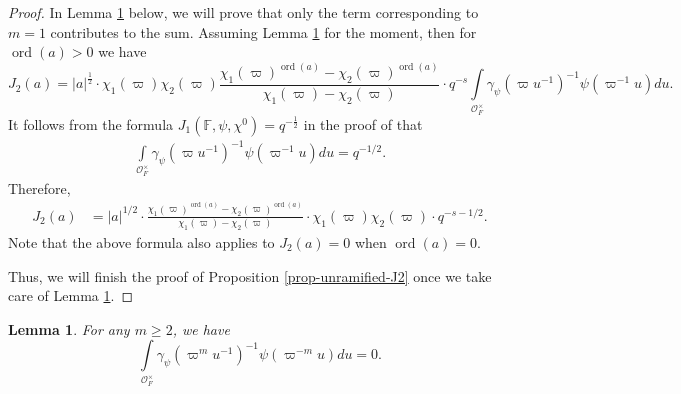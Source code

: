 \documentclass[11pt]{amsart}
\newtheorem{lemma}[theorem]{Lemma}
\theoremstyle{definition}
\theoremstyle{remark}
\newcommand{\on}{\operatorname}
\newcommand{\ord}{\on{ord}}
\begin{document}
\begin{proof}
In Lemma \ref{lemma-local-integral-gamma-psi-vanishing} below, we will prove that only the term corresponding to $m=1$ contributes to the sum. Assuming Lemma \ref{lemma-local-integral-gamma-psi-vanishing} for the moment, then for $\ord(a)>0$ we have
\begin{equation*}
J_2(a)= |a|^{\frac{1}{2}} \cdot  \chi_1(\varpi)\chi_2(\varpi)  
\frac{\chi_1(\varpi)^{\ord(a)}-\chi_2(\varpi)^{\ord(a)}}{\chi_1(\varpi)-\chi_2(\varpi)}   \cdot q^{-s}      \int\limits_{\mathcal{O}_F^\times} \gamma_\psi( \varpi u^{-1})^{-1}  \psi( \varpi^{-1} u)du.
\end{equation*}
It follows from the formula $J_1(\mathbb{F},\psi,\chi^0)=q^{-\frac{1}{2}}$ in the proof of \cite[Lemma 1.12]{Szpruch2009} that
\begin{equation*}
\begin{split}
\int\limits_{\mathcal{O}_F^\times} \gamma_\psi( \varpi u^{-1})^{-1}  \psi(\varpi^{-1} u )  du =q^{-1/2} .
\end{split}
\end{equation*}
Therefore, 
\begin{equation*}
\begin{split}
J_2(a) &=   |a|^{1/2}\cdot   \frac{\chi_1(\varpi)^{\ord(a)}  - \chi_2(\varpi)^{\ord(a)} }{\chi_1(\varpi)-\chi_2(\varpi)} \cdot  \chi_1(\varpi)\chi_2(\varpi)  \cdot  q^{-s-1/2} .
\end{split}
\end{equation*}
Note that the above formula also applies to $J_2(a)=0$ when $\ord(a)=0$.

Thus, we will finish the proof of Proposition \ref{prop-unramified-J2} once we take care of Lemma \ref{lemma-local-integral-gamma-psi-vanishing}.
\end{proof}

\begin{lemma}
For any $m\ge 2$, we have
$$
  \int\limits_{\mathcal{O}_F^\times} \gamma_\psi( \varpi^{m} u^{-1})^{-1}  \psi( \varpi^{-m} u)du=0.
$$
\label{lemma-local-integral-gamma-psi-vanishing}
\end{lemma}
\end{document}
